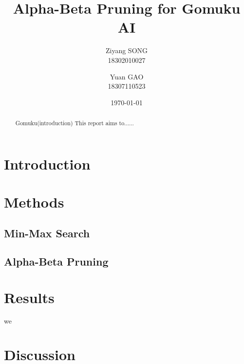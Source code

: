 \documentclass[11pt,en,cite=authoryear]{elegantpaper}
\title{Alpha-Beta Pruning for Gomuku AI}
\author{Ziyang SONG\\ 18302010027 \and Yuan GAO \\ 18307110523}
\institute{DATA130008 2020 Fall}
\date{\today}
\begin{document}
\maketitle

\begin{abstract}
Gomuku(introduction) This report aims to......
\end{abstract}


\section{Introduction}

\section{Methods}

\subsection{Min-Max Search}


\subsection{Alpha-Beta Pruning}

\section{Results}
we \cite{en1}

\section{Discussion}



\end{document}
